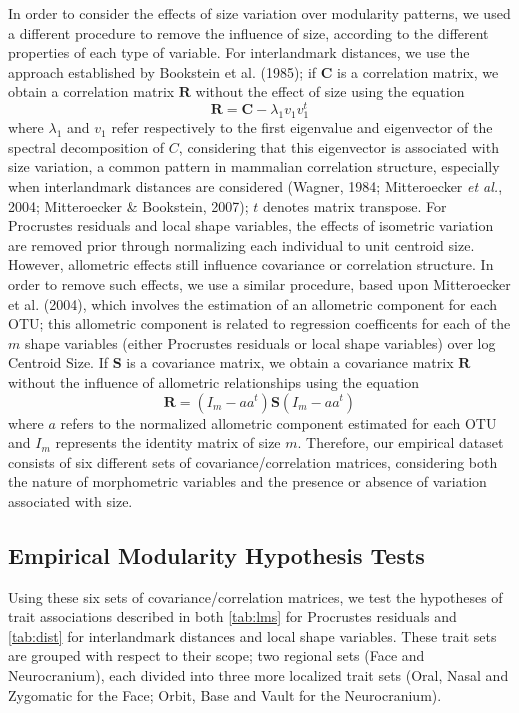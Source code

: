 \documentclass[11pt,twoside]{report}
\begin{document}
In order to consider the effects of size variation over modularity
patterns, we used a different procedure to remove the influence of size,
according to the different properties of each type of variable. For
interlandmark distances, we use the approach established by Bookstein et
al. (1985); if $\mathbf{C}$ is a correlation matrix, we obtain a
correlation matrix $\mathbf{R}$ without the effect of size using the
equation \[
\mathbf{R} = \mathbf{C} - \lambda_1 v_1 v^{t}_1
\] where $\lambda_1$ and $v_1$ refer respectively to the first
eigenvalue and eigenvector of the spectral decomposition of $C$,
considering that this eigenvector is associated with size variation, a
common pattern in mammalian correlation structure, especially when
interlandmark distances are considered (Wagner, 1984; Mitteroecker
\emph{et al.}, 2004; Mitteroecker \& Bookstein, 2007); $t$ denotes
matrix transpose. For Procrustes residuals and local shape variables,
the effects of isometric variation are removed prior through normalizing
each individual to unit centroid size. However, allometric effects still
influence covariance or correlation structure. In order to remove such
effects, we use a similar procedure, based upon Mitteroecker et al.
(2004), which involves the estimation of an allometric component for
each OTU; this allometric component is related to regression coefficents
for each of the $m$ shape variables (either Procrustes residuals or
local shape variables) over log Centroid Size. If $\mathbf{S}$ is a
covariance matrix, we obtain a covariance matrix $\mathbf{R}$ without
the influence of allometric relationships using the equation \[
\mathbf{R} = (I_m - aa^t) \mathbf{S} (I_m - aa^t)
\] where $a$ refers to the normalized allometric component estimated for
each OTU and $I_m$ represents the identity matrix of size $m$.
Therefore, our empirical dataset consists of six different sets of
covariance/correlation matrices, considering both the nature of
morphometric variables and the presence or absence of variation
associated with size.

\subsection{Empirical Modularity Hypothesis
Tests}\label{empirical-modularity-hypothesis-tests}

Using these six sets of covariance/correlation matrices, we test the
hypotheses of trait associations described in both \autoref{tab:lms} for
Procrustes residuals and \autoref{tab:dist} for interlandmark distances
and local shape variables. These trait sets are grouped with respect to
their scope; two regional sets (Face and Neurocranium), each divided
into three more localized trait sets (Oral, Nasal and Zygomatic for the
Face; Orbit, Base and Vault for the Neurocranium).
\end{document}

